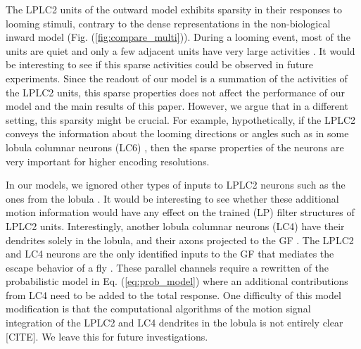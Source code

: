 \documentclass[9pt,lineno]{elife}
\begin{document}
The LPLC2 units of the outward model exhibits sparsity in their responses to looming stimuli, contrary to the dense representations in the non-biological inward model (Fig. (\ref{fig:compare_multi})). During a looming event, most of the units are quiet and only a few adjacent units have very large activities \citep{olshausen1997sparse}. It would be interesting to see if this sparse activities could be observed in future experiments. Since the readout of our model is a summation of the activities of the LPLC2 units, this sparse properties does not affect the performance of our model and the main results of this paper. However, we argue that in a different setting, this sparsity might be crucial. For example, hypothetically, if the LPLC2 conveys the information about the looming directions or angles such as in some lobula columnar neurons (LC6) \citep{morimoto2020spatial}, then the sparse properties of the neurons are very important for higher encoding resolutions. 




In our models, we ignored other types of inputs to LPLC2 neurons such as the ones from the lobula \citep{von2017feature}. It would be interesting to see whether these additional motion information would have any effect on the trained (LP) filter structures of LPLC2 units. Interestingly, another lobula columnar neurons (LC4) have their dendrites solely in the lobula, and their axons projected to the GF \citep{von2017feature}. The LPLC2 and LC4 neurons are the only identified inputs to the GF that mediates the escape behavior of a fly \citep{von2014spike, ache2019neural}. These parallel channels require a rewritten of the probabilistic model in Eq. (\ref{eq:prob_model}) where an additional contributions from LC4 need to be added to the total response. One difficulty of this model modification is that the computational algorithms of the motion signal integration of the LPLC2 and LC4 dendrites in the lobula is not entirely clear [CITE]. We leave this for future investigations. 
\end{document}
